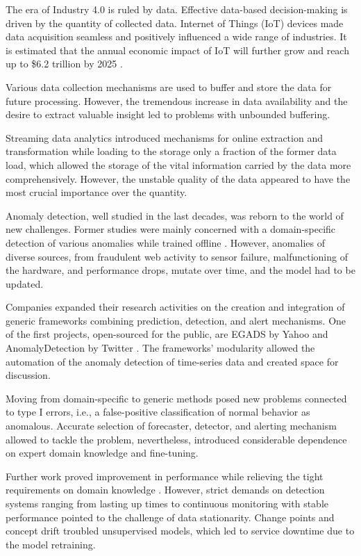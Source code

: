 The era of Industry 4.0 is ruled by data. Effective data-based decision-making is driven by the quantity of collected data. Internet of Things (IoT) devices made data acquisition seamless and positively influenced a wide range of industries. It is estimated that the annual economic impact of IoT will further grow and reach up to \$6.2 trillion by 2025 \cite{Manyika2013}. 

Various data collection mechanisms are used to buffer and store the data for future processing. However, the tremendous increase in data availability and the desire to extract valuable insight led to problems with unbounded buffering.

Streaming data analytics introduced mechanisms for online extraction and transformation while loading to the storage only a fraction of the former data load, which allowed the storage of the vital information carried by the data more comprehensively. However, the unstable quality of the data appeared to have the most crucial importance over the quantity. 

Anomaly detection, well studied in the last decades, was reborn to the world of new challenges. Former studies were mainly concerned with a domain-specific detection of various anomalies while trained offline \cite{Chandola2009}. However, anomalies of diverse sources, from fraudulent web activity to sensor failure, malfunctioning of the hardware, and performance drops, mutate over time, and the model had to be updated.

Companies expanded their research activities on the creation and integration of generic frameworks combining prediction, detection, and alert mechanisms. One of the first projects, open-sourced for the public, are EGADS by Yahoo \cite{Laptev2015} and AnomalyDetection by Twitter \cite{Kejariwal2015}. The frameworks' modularity allowed the automation of the anomaly detection of time-series data and created space for discussion. 

Moving from domain-specific to generic methods posed new problems connected to type I errors, i.e., a false-positive classification of normal behavior as anomalous. Accurate selection of forecaster, detector, and alerting mechanism allowed to tackle the problem, nevertheless, introduced considerable dependence on expert domain knowledge and fine-tuning. 

Further work proved improvement in performance while relieving the tight requirements on domain knowledge \cite{Ahmad2016}. However, strict demands on detection systems ranging from lasting up times to continuous monitoring with stable performance pointed to the challenge of data stationarity. Change points and concept drift troubled unsupervised models, which led to service downtime due to the model retraining. 

